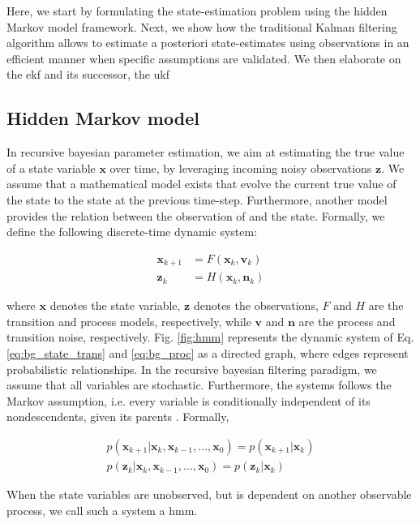 Here, we start by formulating the state-estimation problem using the hidden Markov model framework.
Next, we show how the traditional Kalman filtering algorithm \cite{kalman1960} allows to estimate a posteriori state-estimates using observations in an efficient manner when specific assumptions are validated.
We then elaborate on the \gls{ekf} and its successor, the \gls{ukf}

\subsection{Hidden Markov model}
In recursive bayesian parameter estimation, we aim at estimating the true value of a state variable $\bm{x}$ over time, by leveraging incoming noisy observations $\bm{z}$.
We assume that a mathematical model exists that evolve the current true value of the state to the state at the previous time-step.
Furthermore, another model provides the relation between the observation of and the state.
Formally, we define the following discrete-time dynamic system:

\begin{align}
  \bm{x}_{k+1}&=F(\bm{x}_{k},\bm{v}_{k}) \label{eq:bg_state_trans}\\
  \bm{z}_{k}&= H(\bm{x}_{k}, \bm{n}_{k}) \label{eq:bg_proc}
\end{align}

where $\bm{x}$ denotes the state variable, $\bm{z}$ denotes the observations,
$F$ and $H$ are the transition and process models, respectively, while $\bm{v}$ and $\bm{n}$ are the process and transition noise, respectively.
Fig. \ref{fig:hmm} represents the dynamic system of Eq. \ref{eq:bg_state_trans} and \ref{eq:bg_proc} as a directed graph, where edges represent probabilistic relationships.
In the recursive bayesian filtering paradigm, we assume that all variables are stochastic.
Furthermore, the systems follows the Markov assumption, i.e. every variable is conditionally independent of its nondescendents, given its parents \cite{geiger90}.
Formally,

\begin{align}
  p(\bm{x}_{k+1}|\bm{x}_{k}, \bm{x}_{k-1},\ldots,\bm{x}_{0})=p(\bm{x}_{k+1}|\bm{x}_{k})\\
  p(\bm{z}_{k}|\bm{x}_{k}, \bm{x}_{k-1},\ldots,\bm{x}_{0})=p(\bm{z}_{k}|\bm{x}_{k})
\end{align}

When the state variables are unobserved, but is dependent on another observable process, we call such a system a \gls{hmm}.

